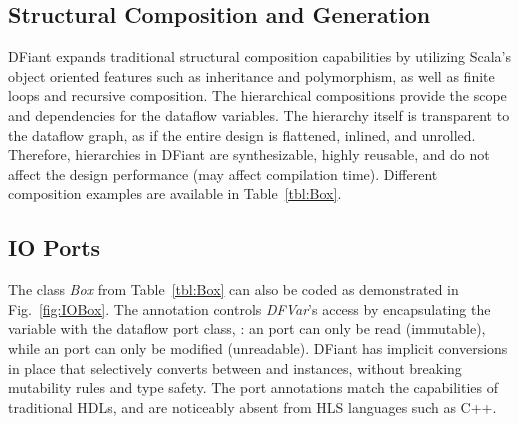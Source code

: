 \subsection{Structural Composition and Generation}

DFiant expands traditional structural composition capabilities by utilizing Scala's object oriented features such as inheritance and polymorphism, as well as finite loops and recursive composition. The hierarchical compositions provide the scope and dependencies for the dataflow variables. The hierarchy itself is transparent to the dataflow graph, as if the entire design is flattened, inlined, and unrolled. Therefore, hierarchies in DFiant are synthesizable, highly reusable, and do not affect the design performance (may affect compilation time). Different composition examples are available in Table~\ref{tbl:Box}.

%

\subsection{IO Ports}
\label{sec:io_ports}
The class \textit{Box} from Table~\ref{tbl:Box} can also be coded as demonstrated in Fig.~\ref{fig:IOBox}. The annotation  controls \textit{DFVar}'s access by encapsulating the variable with the dataflow port class, : an  port can only be read (immutable), while an  port can only be modified (unreadable). DFiant has implicit conversions in place that selectively converts between  and  instances, without breaking mutability rules and type safety. The port annotations match the capabilities of traditional HDLs, and are noticeably absent from HLS languages such as C++. 





%
%
%
%
%

